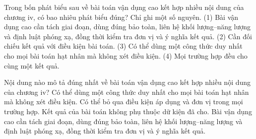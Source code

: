 \begin{ex}
Trong bốn phát biểu sau về bài toán vận dụng cao kết hợp nhiều nội dung của chương iv, có bao nhiêu phát biểu đúng? Chỉ ghi một số nguyên. (1) Bài vận dụng cao cần tách giai đoạn, dùng đúng bảo toàn, liên hệ khối lượng–năng lượng và định luật phóng xạ, đồng thời kiểm tra đơn vị và ý nghĩa kết quả. (2) Cần đối chiếu kết quả với điều kiện bài toán. (3) Có thể dùng một công thức duy nhất cho mọi bài toán hạt nhân mà không xét điều kiện. (4) Mọi trường hợp đều cho cùng một kết quả.
\end{ex}

\begin{ex}
Nội dung nào mô tả đúng nhất về bài toán vận dụng cao kết hợp nhiều nội dung của chương iv?
\choice
{Có thể dùng một công thức duy nhất cho mọi bài toán hạt nhân mà không xét điều kiện.}
{Có thể bỏ qua điều kiện áp dụng và đơn vị trong mọi trường hợp.}
{Kết quả của bài toán không phụ thuộc dữ kiện đã cho.}
{\True Bài vận dụng cao cần tách giai đoạn, dùng đúng bảo toàn, liên hệ khối lượng–năng lượng và định luật phóng xạ, đồng thời kiểm tra đơn vị và ý nghĩa kết quả.}
\end{ex}

